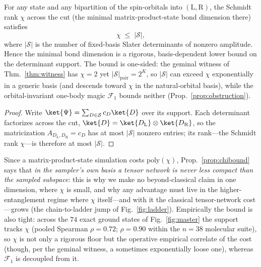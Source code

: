 \begin{proposition}
\label{prop:chibound}
For any state and any bipartition of the spin-orbitals into $(\mathrm L,\mathrm R)$, the Schmidt rank
$\chi$ across the cut (the minimal matrix-product-state bond dimension there) satisfies
\begin{equation}
\chi \;\le\; |\mathcal S|,
\end{equation}
where $|\mathcal S|$ is the number of fixed-basis Slater determinants of nonzero amplitude. Hence the
minimal bond dimension is a rigorous, basis-dependent lower bound on the determinant support. The bound is
one-sided: the geminal witness of Thm.~\ref{thm:witness} has $\chi=2$ yet $|\mathcal S|_{\mathrm{pair}}=2^{K}$,
so $|\mathcal S|$ can exceed $\chi$ exponentially in a generic basis (and descends toward $\chi$ in the
natural-orbital basis), while the orbital-invariant one-body magic $\mathcal F_1$ bounds neither
(Prop.~\ref{prop:obstruction}).
\end{proposition}
\begin{proof}
Write $\ket{\Psi}=\sum_{D\in\mathcal S}c_D\ket{D}$ over its support. Each determinant factorizes across the
cut, $\ket{D}=\ket{D_{\mathrm L}}\otimes\ket{D_{\mathrm R}}$, so the matricization
$A_{D_{\mathrm L},D_{\mathrm R}}=c_D$ has at most $|\mathcal S|$ nonzero entries; its rank---the Schmidt
rank $\chi$---is therefore at most $|\mathcal S|$.
\end{proof}
\noindent Since a matrix-product-state simulation costs $\mathrm{poly}(\chi)$, Prop.~\ref{prop:chibound}
says that \emph{in the sampler's own basis a tensor network is never less compact than the sampled
subspace}: this is why we make no beyond-classical claim in one dimension, where $\chi$ is small, and why
any advantage must live in the higher-entanglement regime where $\chi$ itself---and with it the classical
tensor-network cost---grows (the chain-to-ladder jump of Fig.~\ref{fig:ladder}). Empirically the bound is
also tight: across the $74$ exact ground states of Fig.~\ref{fig:master} the support tracks $\chi$
(pooled Spearman $\rho=0.72$; $\rho=0.90$ within the $n=38$ molecular suite), so $\chi$ is not only a
rigorous floor but the operative empirical correlate of the cost (though, per the geminal witness, a
sometimes exponentially loose one), whereas $\mathcal F_1$ is decoupled from it.


